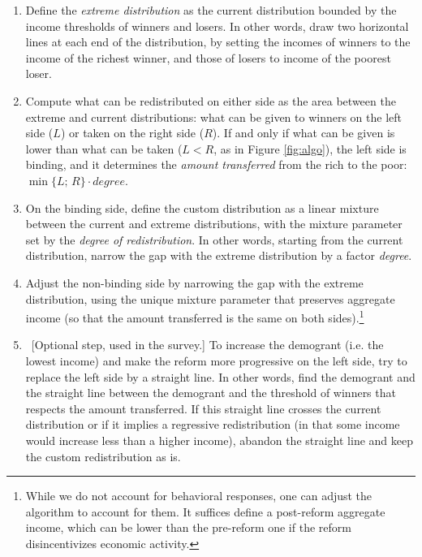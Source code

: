 \begin{enumerate}
    \item Define the \textit{extreme distribution} as the current distribution bounded by the income thresholds of winners and losers. In other words, draw two horizontal lines at each end of the distribution, by setting the incomes of winners to the income of the richest winner, and those of losers to income of the poorest loser.
    \item Compute what can be redistributed on either side as the area between the extreme and current distributions: what can be given to winners on the left side ($L$) or taken on the right side ($R$). If and only if what can be given is lower than what can be taken ($L < R$, as in Figure \ref{fig:algo}), the left side is binding, and it determines the \textit{amount transferred} from the rich to the poor: $\min\{L;\,R\} \cdot degree$.
    \item On the binding side, define the custom distribution as a linear mixture between the current and extreme distributions, with the mixture parameter set by the \textit{degree of redistribution}. In other words, starting from the current distribution, narrow the gap with the extreme distribution by a factor \textit{degree}.
    \item Adjust the non-binding side by narrowing the gap with the extreme distribution, using the unique mixture parameter that preserves aggregate income (so that the amount transferred is the same on both sides).\footnote{While we do not account for behavioral responses, one can adjust the algorithm to account for them. It suffices define a post-reform aggregate income, which can be lower than the pre-reform one if the reform disincentivizes economic activity.}
    \item ~[Optional step, used in the survey.] To increase the demogrant (i.e. the lowest income) and make the reform more progressive on the left side, try to replace the left side by a straight line. In other words, find the demogrant and the straight line between the demogrant and the threshold of winners that respects the amount transferred. If this straight line crosses the current distribution or if it implies a regressive redistribution (in that some income would increase less than a higher income), abandon the straight line and keep the custom redistribution as is.
\end{enumerate}

